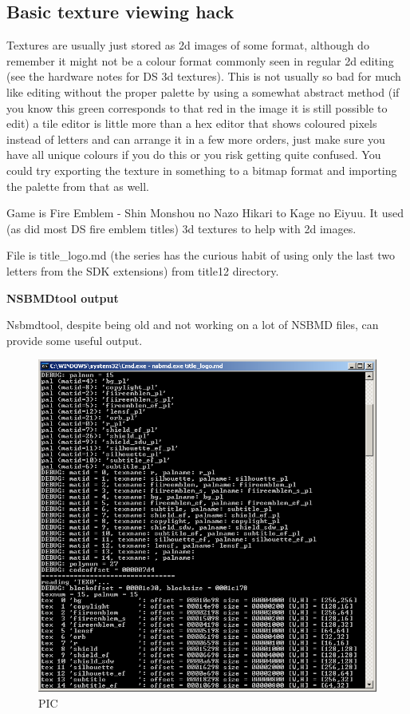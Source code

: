 \documentclass[
]{book}
\begin{document}
\hypertarget{basic-texture-viewing-hack}{%
\subsection{Basic texture viewing hack}\label{basic-texture-viewing-hack}}

Textures are usually just stored as 2d images of some format, although do remember it might not be a colour format commonly seen in regular 2d editing (see the hardware notes for DS 3d textures). This is not usually so bad for much like editing without the proper palette by using a somewhat abstract method (if you know this green corresponds to that red in the image it is still possible to edit) a tile editor is little more than a hex editor that shows coloured pixels instead of letters and can arrange it in a few more orders, just make sure you have all unique colours if you do this or you risk getting quite confused. You could try exporting the texture in something to a bitmap format and importing the palette from that as well.

Game is Fire Emblem - Shin Monshou no Nazo Hikari to Kage no Eiyuu. It used (as did most DS fire emblem titles) 3d textures to help with 2d images.

File is title\_logo.md (the series has the curious habit of using only the last two letters from the SDK extensions) from title12 directory.

\textbf{NSBMDtool output}

Nsbmdtool, despite being old and not working on a lot of NSBMD files, can provide some useful output.

\begin{figure}
\centering
\includegraphics{images/69_home_fast6191_romhackingguide_unrenamed_file___gguidegraphics3dminorNSMBDtexturedecoding_1.png}
\caption{PIC}
\end{figure}
\end{document}
